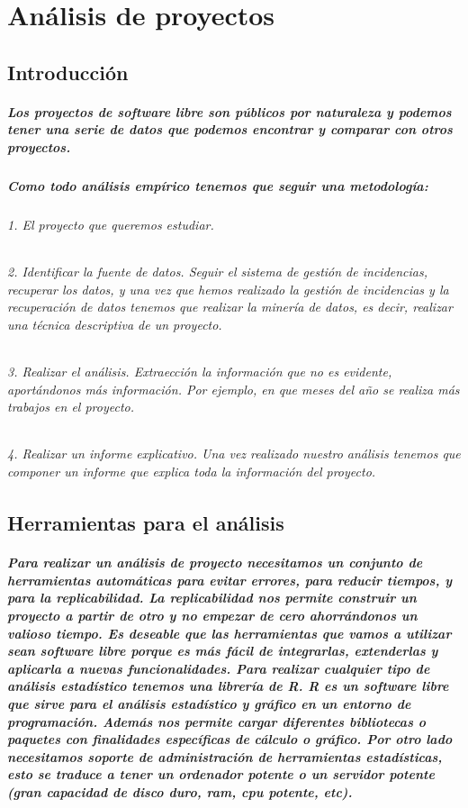 \chapter{An\'alisis de proyectos}
\section{Introducci\'on}
\paragraph{Los proyectos de software libre son p\'ublicos por naturaleza y podemos tener una serie de datos que podemos encontrar y comparar con otros proyectos.}
\paragraph{Como todo an\'alisis emp\'irico tenemos que seguir una metodolog\'ia:}
\subparagraph{1. El proyecto que queremos estudiar.}
\subparagraph{2. Identificar la fuente de datos. Seguir el sistema de gesti\'on de incidencias, recuperar los datos, y una vez que hemos realizado la gesti\'on de incidencias y la recuperaci\'on de datos tenemos que realizar la miner\'ia de datos, es decir, realizar una t\'ecnica descriptiva de un proyecto.}
\subparagraph{3. Realizar el an\'alisis. Extraecci\'on la informaci\'on que no es evidente, aport\'andonos m\'as informaci\'on. Por ejemplo, en que meses del a\~no se realiza m\'as trabajos en el proyecto.}
\subparagraph{4. Realizar un informe explicativo. Una vez realizado nuestro an\'alisis tenemos que componer un informe que explica toda la informaci\'on del proyecto.}
\section{Herramientas para el an\'alisis}
\paragraph{Para realizar un an\'alisis de proyecto necesitamos un conjunto de herramientas autom\'aticas para evitar errores, para reducir tiempos, y para la replicabilidad. La replicabilidad nos permite construir un proyecto a partir de otro y no empezar de cero ahorr\'andonos un valioso tiempo. 
Es deseable que las herramientas que vamos a utilizar sean software libre porque es m\'as f\'acil de integrarlas, extenderlas y aplicarla a nuevas funcionalidades. 
Para realizar cualquier tipo de an\'alisis estad\'istico tenemos una librer\'ia de R. R es un software libre que sirve para el análisis estad\'istico y gr\'afico en un entorno de programaci\'on. Adem\'as nos permite cargar diferentes bibliotecas o paquetes con finalidades espec\'ificas de c\'alculo o gr\'afico. 
Por otro lado necesitamos soporte de administraci\'on de herramientas estad\'isticas, esto se traduce a tener un ordenador potente o un servidor potente (gran capacidad de disco duro, ram, cpu potente, etc).}
